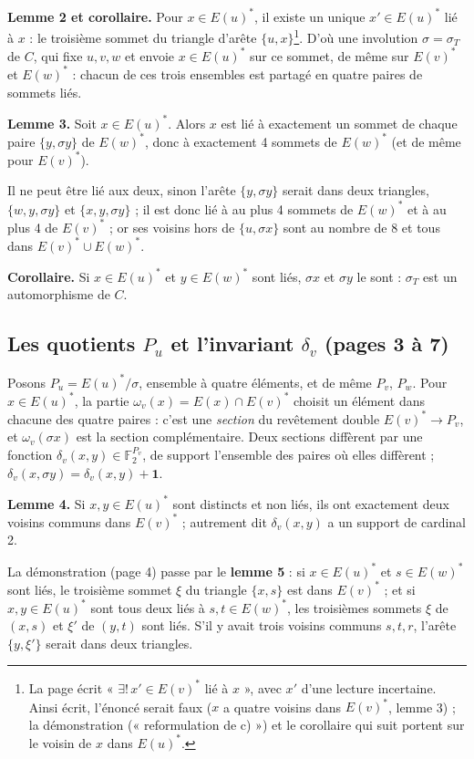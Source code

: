 \documentclass[11pt,a4paper]{article}
\begin{document}
\textbf{Lemme 2 et corollaire.} Pour $x \in E(u)^*$, il existe un unique $x'
\in E(u)^*$ lié à $x$ : le troisième sommet du triangle d'arête $\lbrace u,
x\rbrace$\footnote{La page écrit « $\exists!\, x' \in E(v)^*$ lié à $x$ », avec
$x'$ d'une lecture incertaine. Ainsi écrit, l'énoncé serait faux ($x$ a quatre
voisins dans $E(v)^*$, lemme 3) ; la démonstration (« reformulation de c) ») et
le corollaire qui suit portent sur le voisin de $x$ dans $E(u)^*$.}. D'où une
involution $\sigma = \sigma_T$ de $C$, qui fixe $u, v, w$ et envoie $x \in
E(u)^*$ sur ce sommet, de même sur $E(v)^*$ et $E(w)^*$ : chacun de ces trois
ensembles est partagé en quatre paires de sommets liés.

\textbf{Lemme 3.} Soit $x \in E(u)^*$. Alors $x$ est lié à exactement un
sommet de chaque paire $\lbrace y, \sigma y\rbrace$ de $E(w)^*$, donc à
exactement 4 sommets de $E(w)^*$ (et de même pour $E(v)^*$).

Il ne peut être lié aux deux, sinon l'arête $\lbrace y, \sigma y\rbrace$ serait
dans deux triangles, $\lbrace w, y, \sigma y\rbrace$ et $\lbrace x, y, \sigma
y\rbrace$ ; il est donc lié à au plus 4 sommets de $E(w)^*$ et à au plus 4 de
$E(v)^*$ ; or ses voisins hors de $\lbrace u, \sigma x\rbrace$ sont au nombre
de 8 et tous dans $E(v)^* \cup E(w)^*$.

\textbf{Corollaire.} Si $x \in E(u)^*$ et $y \in E(w)^*$ sont liés, $\sigma x$
et $\sigma y$ le sont : $\sigma_T$ est un automorphisme de $C$.

\subsection*{Les quotients $P_u$ et l'invariant $\delta_v$ (pages 3 à 7)}

Posons $P_u = E(u)^*/\sigma$, ensemble à quatre éléments, et de même $P_v$,
$P_w$. Pour $x \in E(u)^*$, la partie $\omega_v(x) = E(x) \cap E(v)^*$ choisit
un élément dans chacune des quatre paires : c'est une \emph{section} du
revêtement double $E(v)^* \to P_v$, et $\omega_v(\sigma x)$ est la section
complémentaire. Deux sections diffèrent par une fonction $\delta_v(x, y) \in
\mathbb{F}_2^{P_v}$, de support l'ensemble des paires où elles diffèrent ;
$\delta_v(x, \sigma y) = \delta_v(x, y) + \mathbf{1}$.

\textbf{Lemme 4.} Si $x, y \in E(u)^*$ sont distincts et non liés, ils ont
exactement deux voisins communs dans $E(v)^*$ ; autrement dit $\delta_v(x,
y)$ a un support de cardinal 2.

La démonstration (page 4) passe par le \textbf{lemme 5} : si $x \in E(u)^*$ et
$s \in E(w)^*$ sont liés, le troisième sommet $\xi$ du triangle $\lbrace x,
s\rbrace$ est dans $E(v)^*$ ; et si $x, y \in E(u)^*$ sont tous deux liés à
$s, t \in E(w)^*$, les troisièmes sommets $\xi$ de $(x, s)$ et $\xi'$ de $(y,
t)$ sont liés. S'il y avait trois voisins communs $s, t, r$, l'arête $\lbrace y,
\xi'\rbrace$ serait dans deux triangles.
\end{document}
